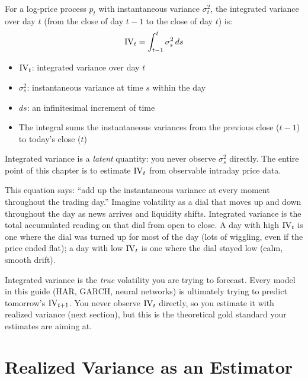 \begin{definition}
For a log-price process $p_t$ with instantaneous variance $\sigma^2_t$, the integrated variance over day $t$ (from the close of day $t-1$ to the close of day $t$) is:
\begin{equation}
  \operatorname{IV}_t = \int_{t-1}^{t} \sigma^2_s \, ds
  \label{eq:iv}
\end{equation}
\begin{itemize}[nosep]
  \item $\operatorname{IV}_t$: integrated variance over day $t$
  \item $\sigma^2_s$: instantaneous variance at time $s$ within the day
  \item $ds$: an infinitesimal increment of time
  \item The integral sums the instantaneous variances from the previous close ($t-1$) to today's close ($t$)
\end{itemize}
\end{definition}

Integrated variance is a \emph{latent} quantity: you never observe $\sigma^2_s$ directly.
The entire point of this chapter is to estimate $\operatorname{IV}_t$ from observable intraday price data.

\begin{intuition}
This equation says: ``add up the instantaneous variance at every moment throughout the trading day.''
Imagine volatility as a dial that moves up and down throughout the day as news arrives and liquidity shifts.
Integrated variance is the total accumulated reading on that dial from open to close.
A day with high $\operatorname{IV}_t$ is one where the dial was turned up for most of the day (lots of wiggling, even if the price ended flat); a day with low $\operatorname{IV}_t$ is one where the dial stayed low (calm, smooth drift).
\end{intuition}

\begin{projectconnection}
Integrated variance is the \emph{true} volatility you are trying to forecast.
Every model in this guide (HAR, GARCH, neural networks) is ultimately trying to predict tomorrow's $\operatorname{IV}_{t+1}$.
You never observe $\operatorname{IV}_t$ directly, so you estimate it with realized variance (next section), but this is the theoretical gold standard your estimates are aiming at.
\end{projectconnection}

\section{Realized Variance as an Estimator}
\label{sec:rv-estimator}


